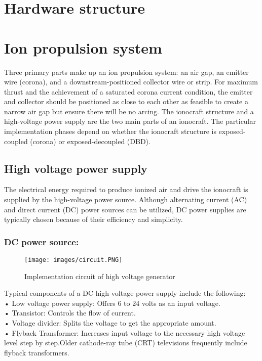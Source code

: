 \section*{Hardware structure}
\section*{Ion propulsion system}
\hspace{\parindent}Three primary parts make up an ion propulsion system: an air gap, an emitter wire (corona), and a downstream-positioned collector wire or strip. For maximum thrust and the achievement of a saturated corona current condition, the emitter and collector should be positioned as close to each other as feasible to create a narrow air gap but ensure there will be
no arcing\cite{cichocki2017electric}. The ionocraft structure and a high-voltage power supply are the two main parts of an ionocraft. The particular implementation phases depend on whether the ionocraft structure is exposed-coupled (corona) or exposed-decoupled (DBD).
\subsection*{High voltage power supply}
\hspace{\parindent}The electrical energy required to produce ionized air and drive the ionocraft is supplied by the high-voltage power source. Although alternating current (AC) and direct current (DC) power sources can be utilized, DC power supplies are typically chosen because of their efficiency and simplicity.
\subsubsection*{DC power source:}
\begin{wrapfigure}{r}{0.5\textwidth} %
    \centering
    \texttt{[image: images/circuit.PNG]}
    \caption{Implementation circuit of high voltage generator}
\end{wrapfigure}
\hspace{\parindent}Typical components of a DC high-voltage power supply include the following:\\
• Low voltage power supply: Offers 6 to 24 volts as an input voltage.\\
• Transistor: Controls the flow of current.\\
• Voltage divider: Splits the voltage to get the appropriate amount.\\
• Flyback Transformer: Increases input voltage to the necessary high voltage level step by step.Older cathode-ray tube (CRT) televisions frequently include flyback transformers.\\\\
